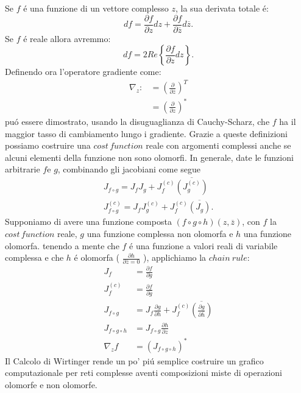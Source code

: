 \documentclass[a4paper,10pt]{article}
\begin{document}
Se $f$ \'e una funzione di un vettore complesso $z$, la sua derivata totale \'e:
\begin{equation}
 df=\frac{\partial f}{\partial z}dz+\frac{\partial f}{\partial \overline{z}}d\overline{z}.
\end{equation}
Se $f$ \'e reale allora avremmo:
\begin{equation}
 df=2Re\left \{ \frac{\partial f}{\partial z} dz \right \}.
\end{equation}
Definendo ora l'operatore gradiente come:
\begin{align}
 \nabla_z :&= \left(\frac{\partial}{\partial\overline{z}}\right)^T\\
 &=\left(\frac{\partial}{\partial z}\right)^*
\end{align}
pu\'o essere dimostrato, usando la disuguaglianza di Cauchy-Scharz, che $f$ ha il maggior tasso di cambiamento lungo i gradiente. Grazie a queste definizioni possiamo costruire una $cost \, function$ reale con argomenti complessi anche se alcuni elementi della funzione non sono olomorfi. In generale, date le funzioni arbitrarie $f$e $g$, combinando gli jacobiani come segue
\begin{align}
 J_{f\circ g} = J_f J_g + J_f^{\left(c\right)}\overline{\left(J_g^{\left(c\right)}\right)}\\
 J_{f\circ g}^{\left(c\right)} = J_f J_g^{\left(c\right)} + J_f^{\left(c\right)}\overline{\left(J_g\right)}.
\end{align}
Supponiamo di avere una funzione composta $\left(f\circ g\circ h\right)\left(z,\overline{z}\right)$, con $f$ la $cost \, function$ reale, $g$ una funzione complessa non olomorfa e $h$ una funzione olomorfa. tenendo a mente che $f$ \'e una funzione a valori reali di variabile complessa e che $h$ \'e olomorfa ( $\frac{\partial h}{\partial \overline{z} = 0}$ ), applichiamo la $chain \ rule$:
\begin{align}
 J_f &= \frac{ \partial f}{ \partial g}\\
 J_f^{\left( c\right)} &= \frac{\partial f}{\partial \overline{g}}\\
 J_{f\circ g} &= J_f \frac{\partial g}{\partial h} + J_f^{\left( c\right)} \overline{\left( \frac{\partial g}{\partial \overline{h}}\right) }\\
 J_{f\circ g\circ h} &= J_{f\circ g} \frac{\partial h}{\partial z}\\
 \nabla_z f &= \left( J_{f\circ g\circ h}\right)^*
\end{align}
Il Calcolo di Wirtinger rende un po' pi\'u semplice costruire un grafico computazionale per reti complesse aventi composizioni miste di operazioni olomorfe e non olomorfe.
\end{document}
